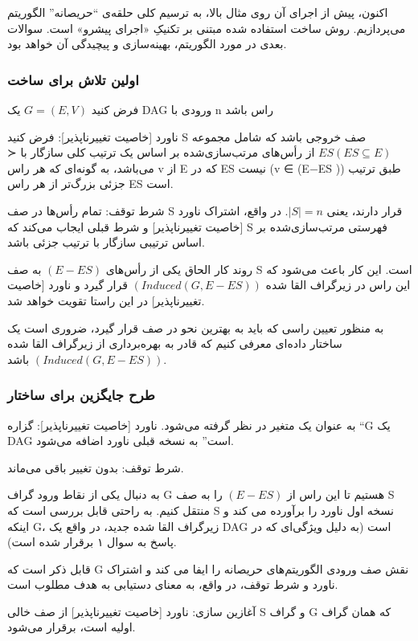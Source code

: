 \documentclass{book} %
\begin{document}
اکنون، پیش از اجرای آن روی مثال بالا، به ترسیم کلی حلقه‌ی “حریصانه” الگوریتم می‌پردازیم.
روش ساخت استفاده شده مبتنی بر تکنیکِ «اجرای پیشرو» است. سوالات بعدی در مورد
الگوریتم، بهینه‌سازی و پیچیدگی آن خواهد بود.

\newpage

\subsubsection*{اولین تلاش برای ساخت}
فرض کنید $G = (E, V)$ یک DAG ورودی با n راس باشد

ناورد [خاصیت تغییرناپذیر]: فرض کنید S صف خروجی باشد که شامل مجموعه $ES (ES ⊆ E)$ از رأس‌های مرتب‌سازی‌شده بر اساس یک ترتیب کلی سازگار با ≺  می‌باشد، به گونه‌ای که هر راس v از E که در ES نیست (v ∈ (E−ES )) طبق ترتیب جزئی بزرگ‌تر از هر راس ES است.

شرط توقف: تمام رأس‌ها در صف S قرار دارند، یعنی $|S| = n$.
در واقع، اشتراک ناورد [خاصیت تغییرناپذیر] و شرط قبلی ایجاب می‌کند که S
فهرستی مرتب‌سازی‌شده بر اساس ترتیبی سازگار با ترتیب جزئی باشد.

روند کار الحاق یکی از رأس‌های $(E − ES )$ به صف S است.
این کار باعث می‌شود که این راس در زیرگراف القا شده $(Induced(G, E − ES ))$ قرار گیرد
و ناورد [خاصیت تغییرناپذیر] در این راستا تقویت خواهد شد.

به منظور تعیین راسی که باید به بهترین نحو در صف قرار گیرد، ضروری است یک ساختار
داده‌ای معرفی کنیم که قادر به بهره‌برداری از زیرگراف القا شده $(Induced(G, E − ES ))$ باشد.

\subsubsection*{طرح جایگزین برای ساختار}
به عنوان یک متغیر در نظر گرفته می‌شود.
ناورد [خاصیت تغییرناپذیر]: گزاره “G یک DAG است” به نسخه قبلی ناورد اضافه می‌شود.

شرط توقف: بدون تغییر باقی می‌ماند.

به دنبال یکی از نقاط ورود گراف G هستیم تا این راس از $(E − ES )$ را به صف S منتقل کنیم.
به راحتی قابل بررسی است که S نسخه اول ناورد را برآورده می کند و اینکه G، زیرگراف القا
شده جدید، در واقع یک DAG است (به دلیل ویژگی‌ای که در پاسخ به سوال ۱ برقرار شده است).

قابل ذکر است که G نقش صف ورودی الگوریتم‌های حریصانه را ایفا می کند و اشتراک ناورد و
شرط توقف، در واقع، به معنای دستیابی به هدف مطلوب است.

آغازین سازی: ناورد [خاصیت تغییرناپذیر] از صف خالی S
و گراف G که همان گراف اولیه است، برقرار می‌شود.
\end{document}
